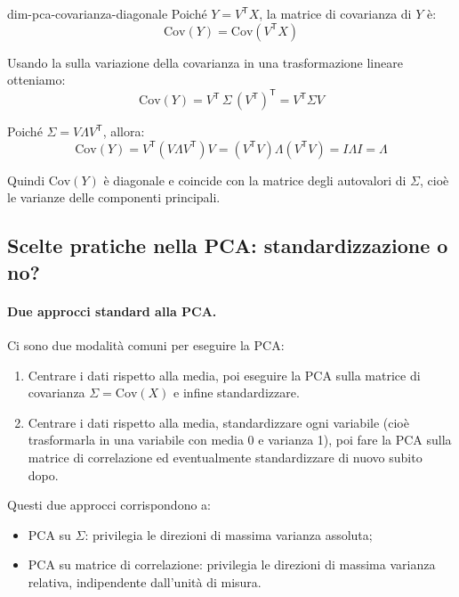 \begin{dimostrazione}{}{dim-pca-covarianza-diagonale}
Poiché \( Y = V^\mathsf{T} X \), la matrice di covarianza di \( Y \) è:
\[
\mathrm{Cov}(Y) = \mathrm{Cov}(V^\mathsf{T} X)
\]

Usando la  sulla variazione della covarianza in una
trasformazione lineare otteniamo:
\[
    \mathrm{Cov}(Y)
    = V^\mathsf{T} \, \Sigma \, (V^\mathsf{T})^\mathsf{T}
    = V^\mathsf{T} \Sigma V
\]

Poiché \( \Sigma = V \Lambda V^\mathsf{T} \), allora:
\[
\mathrm{Cov}(Y) = V^\mathsf{T} (V \Lambda V^\mathsf{T}) V = (V^\mathsf{T} V)
\Lambda (V^\mathsf{T} V) = I \Lambda I = \Lambda
\]

Quindi \( \mathrm{Cov}(Y) \) è diagonale e coincide con la matrice degli
autovalori di \( \Sigma \), cioè le varianze delle componenti principali.
\end{dimostrazione}

\subsection{Scelte pratiche nella PCA: standardizzazione o no?}

\paragraph{Due approcci standard alla PCA.}
Ci sono due modalità comuni per eseguire la PCA:

\begin{enumerate}
  \item Centrare i dati rispetto alla media, poi eseguire la PCA sulla matrice
  di covarianza \( \Sigma = \mathrm{Cov}(X) \) e infine standardizzare.
  \item Centrare i dati rispetto alla media, standardizzare ogni variabile
  (cioè trasformarla in una variabile con media 0 e varianza 1), poi fare la
  PCA sulla matrice di correlazione ed eventualmente standardizzare di nuovo
  subito dopo.
\end{enumerate}

Questi due approcci corrispondono a:

\begin{itemize}
  \item PCA su \( \Sigma \): privilegia le direzioni di massima varianza
  assoluta;
  \item PCA su matrice di correlazione: privilegia le direzioni di massima
  varianza relativa, indipendente dall'unità di misura.
\end{itemize}

